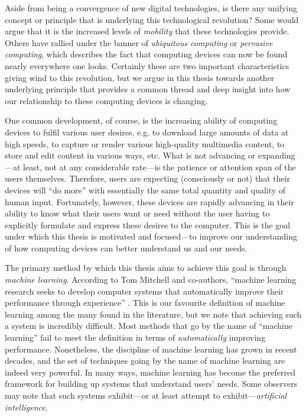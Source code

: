 Aside from being a convergence of new digital technologies, is there any unifying concept or principle that is underlying this technological revolution? Some would argue that it is the increased levels of \emph{mobility} that these technologies provide. Others have rallied under the banner of \emph{ubiquitous computing} or \emph{pervasive computing}, which describes the fact that computing devices can now be found nearly everywhere one looks. Certainly these are two important characteristics giving wind to this revolution, but we argue in this thesis towards another underlying principle that provides a common thread and deep insight into how our relationship to these computing devices is changing.

One common development, of course, is the increasing ability of computing devices to fulfil various user desires, e.g. to download large amounts of data at high speeds, to capture or render various high-quality multimedia content, to store and edit content in various ways, etc. What is not advancing or expanding---at least, not at any considerable rate---is the patience or attention span of the users themselves. Therefore, users are expecting (consciously or not) that their devices will ``do more'' with essentially the same total quantity and quality of human input. Fortunately, however, these devices are rapidly advancing in their ability to know what their users want or need without the user having to explicitly formulate and express these desires to the computer. This is the goal under which this thesis is motivated and focused---to improve our understanding of how computing devices can better understand us and our needs.

The primary method by which this thesis aims to achieve this goal is through \emph{machine learning}. According to Tom Mitchell and co-authors, ``machine learning research seeks to develop computer systems that automatically improve their performance through experience'' \cite{Mitchell1990}. This is our favourite definition of machine learning among the many found in the literature, but we note that achieving such a system is incredibly difficult. Most methods that go by the name of ``machine learning'' fail to meet the definition in terms of \emph{automatically} improving performance. Nonetheless, the discipline of machine learning has grown in recent decades, and the set of techniques going by the name of machine learning are indeed very powerful. In many ways, machine learning has become the preferred framework for building up systems that understand users' needs. Some observers may note that such systems exhibit---or at least attempt to exhibit---\emph{artificial intelligence}.

